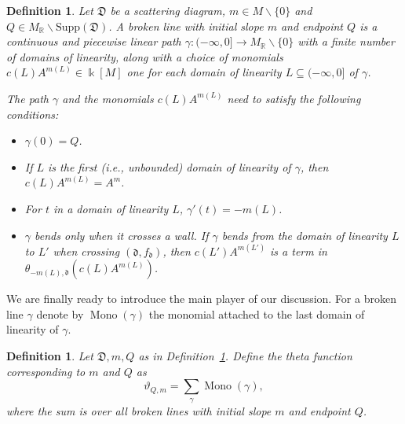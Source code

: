 \documentclass[11pt]{amsart}
\newtheorem{defn}[theorem]{Definition}
\theoremstyle{remark}
\numberwithin{equation}{section}
\newcommand{\RR}{\mathbb{R}}
\newcommand{\fd}{\mathfrak{d}}
\newcommand{\fD}{\mathfrak{D}}
\newcommand{\Mono}{\operatorname{Mono}}
\begin{document}
\begin{defn} 
  \label{brokendef}
  Let $\fD$ be a scattering diagram, $m \in M \backslash \{0\}$ and $Q \in
  M_{\RR} \backslash \text{Supp}(\fD)$.  A \emph{broken line} with initial slope
  $m$ and endpoint $Q$ is a continuous and piecewise linear path $\gamma : ( -
  \infty , 0] \rightarrow M_{\mathbb{R}} \backslash \{ 0\} $ with a finite
  number of domains of linearity, along with a choice of monomials $c(L) A^{m(L)}
  \in \Bbbk[M]$ one for each domain of linearity $L \subseteq ( - \infty, 0]$ of
  $\gamma$. 
  
  The path $\gamma$ and the monomials $c(L) A^{m(L)}$ need to satisfy the
  following conditions:
  \begin{itemize}
    \item 
      $\gamma(0) = Q$.
    
    \item 
      If $L$ is the first (i.e., unbounded) domain of linearity of $\gamma$,
      then $c(L) A^{m(L)} = A^{m}$.

    \item 
      For $t$ in a domain of linearity $L$, $\gamma'(t) = -m(L)$.

    \item 
      $\gamma$ bends only when it crosses a wall. If $\gamma$ bends from the
      domain of linearity $L$ to $ L'$ when crossing $(\fd, f_{\fd})$, then
      $c(L')A^{m(L')}$ is a term in $\theta_{-m(L), \fd} \left(c(L)
        A^{m(L)}\right)$.  
  \end{itemize}
\end{defn}

We are finally ready to introduce the main player of our discussion.
For a broken line $\gamma$  denote by
$\Mono (\gamma)$ the monomial attached to the last domain of linearity of $\gamma$.
\begin{defn}
  Let $\fD, m, Q$ as in Definition~\ref{brokendef}.  Define the \emph{theta function} corresponding to $m$ and $Q$
  as
  \[ 
    \vartheta_{Q, m} = \sum_{\gamma} \Mono (\gamma), 
  \] 
  where the sum is over all broken lines with initial slope $m$ and endpoint
  $Q$.
\end{defn}
\end{document}
